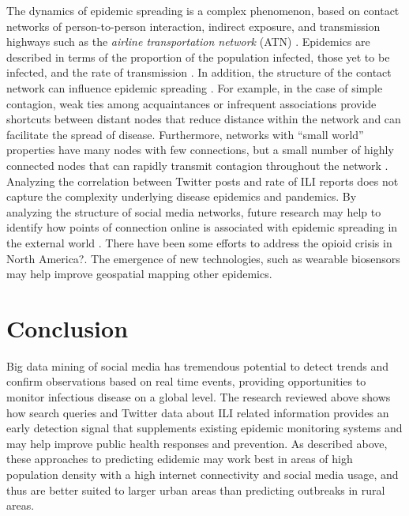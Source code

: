 \documentclass[sigconf]{acmart}
\begin{document}
The dynamics of epidemic spreading is a 
complex phenomenon, based on contact networks of person-to-person interaction, indirect 
exposure, and transmission highways such as the {\it airline transportation network} (ATN) 
\cite{Colizza06}. Epidemics are described in terms of the proportion of the population 
infected, those yet to be infected, and the rate of transmission \cite{hethcote00}. 
In addition, the structure of the contact network can influence epidemic spreading 
\cite{pastor01}. For example, in the case of simple contagion, weak ties among 
acquaintances or infrequent associations provide shortcuts between distant nodes that 
reduce distance within the network \cite{granovetter73} and can facilitate the spread of 
disease. Furthermore, networks with ``small world'' properties have many nodes with few 
connections, but a small number of highly connected nodes that can rapidly transmit 
contagion throughout the network \cite{watts98}. Analyzing the correlation between 
Twitter posts and rate of ILI reports does not capture the complexity underlying disease 
epidemics and pandemics. By analyzing the structure of social media networks, future 
research may help to identify how points of connection online is associated with epidemic 
spreading in the external world \cite{zhu17}. There have been some efforts to address the 
opioid crisis in North America?\cite{smith16}. The emergence of new technologies, such as 
wearable biosensors \cite{carreiro15} may help improve geospatial mapping other epidemics.

\section{Conclusion}

Big data mining of social media has tremendous potential to detect trends and confirm 
observations based on real time events, providing opportunities to monitor infectious 
disease on a global level. The research reviewed above shows how search queries and 
Twitter data about ILI related information provides an early detection signal that 
supplements existing epidemic monitoring systems and may help improve public health 
responses and prevention. As described above, these approaches to predicting edidemic
may work best in areas of high population density with a high internet connectivity
and social media usage, and thus are better suited to larger urban areas than 
predicting outbreaks in rural areas. 


 
\end{document}
